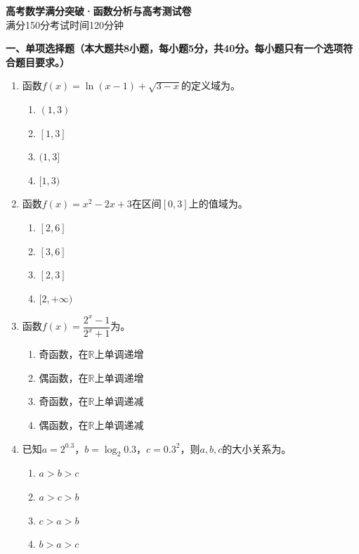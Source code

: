 \documentclass[12pt, a4paper]{ctexart}
\newcommand{\blank}[1]{\underline{\hspace{#1}}}
\begin{document}
\begin{center}
{\LARGE\bfseries 高考数学满分突破·函数分析与高考\quad 测试卷}\\[0.5em]
{\large 满分150分\quad 考试时间120分钟}
\end{center}

\vspace{1em}

\noindent\textbf{一、单项选择题（本大题共8小题，每小题5分，共40分。每小题只有一个选项符合题目要求。）}

\begin{enumerate}
\item 函数$f(x)=\ln(x-1)+\sqrt{3-x}$的定义域为\blank{3cm}。
\begin{enumerate}[label=\Alph*.]
\item $(1,3)$
\item $[1,3]$
\item $(1,3]$
\item $[1,3)$
\end{enumerate}

\item 函数$f(x)=x^2-2x+3$在区间$[0,3]$上的值域为\blank{3cm}。
\begin{enumerate}[label=\Alph*.]
\item $[2,6]$
\item $[3,6]$
\item $[2,3]$
\item $[2,+\infty)$
\end{enumerate}

\item 函数$f(x)=\dfrac{2^x-1}{2^x+1}$为\blank{3cm}。
\begin{enumerate}[label=\Alph*.]
\item 奇函数，在$\mathbb{R}$上单调递增
\item 偶函数，在$\mathbb{R}$上单调递增
\item 奇函数，在$\mathbb{R}$上单调递减
\item 偶函数，在$\mathbb{R}$上单调递减
\end{enumerate}

\item 已知$a=2^{0.3}$，$b=\log_2 0.3$，$c=0.3^2$，则$a,b,c$的大小关系为\blank{3cm}。
\begin{enumerate}[label=\Alph*.]
\item $a>b>c$
\item $a>c>b$
\item $c>a>b$
\item $b>a>c$
\end{enumerate}


\end{enumerate}
\end{document}

